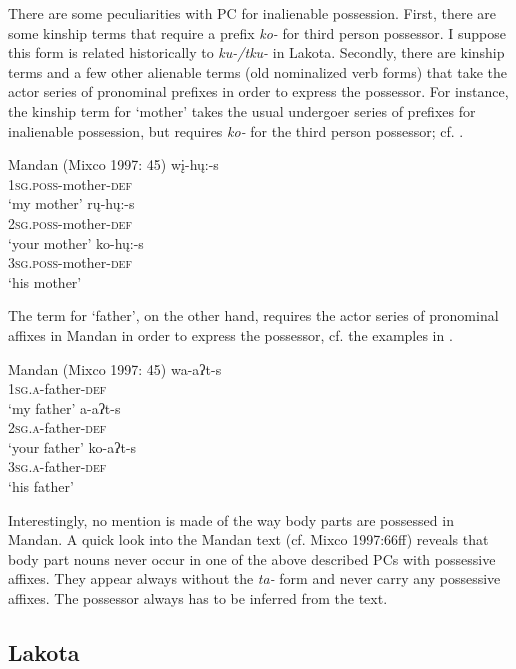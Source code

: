 \documentclass[output=paper]{LSP/langsci}
\begin{document}
There are some peculiarities with PC for inalienable possession. First, there are some kinship terms that require a prefix \textit{ko-} for third person possessor. I suppose this form is related historically to \textit{ku-/tku-} in Lakota. Secondly, there are kinship terms and a few other alienable terms (old nominalized verb forms) that take the actor series of pronominal prefixes in order to express the possessor. For instance, the kinship term for `mother' takes the usual undergoer series of prefixes for inalienable possession, but requires \textit{ko-} for the third person possessor; cf. . 

\ea Mandan (Mixco 1997: 45) \label{mandanmother}
\ea
\gll wį-hų:-s \\			
\textsc{1sg.poss}-mother-\textsc{def} \\
\glt `my mother'
\ex \gll rų-hų:-s \\
\textsc{2sg.poss}-mother-\textsc{def} \\
\glt `your mother'
\ex \gll ko-hų:-s \\
\textsc{3sg.poss}-mother-\textsc{def} \\
\glt `his mother'
\z \z

The term for `father', on the other hand, requires the actor series of pronominal affixes in Mandan in order to express the possessor, cf. the examples in .

\ea Mandan (Mixco 1997: 45) \label{mandanfather}
\ea \gll wa-aʔt-s \\
\textsc{1sg.a}-father-\textsc{def} \\
\glt `my father'
\ex \gll a-aʔt-s \\
\textsc{2sg.a}-father-\textsc{def} \\
\glt `your father'
\ex \gll ko-aʔt-s \\
\textsc{3sg.a}-father-\textsc{def} \\
\glt `his father'
\z \z

Interestingly, no mention is made of the way body parts are possessed in Mandan. A quick look into the Mandan text (cf. Mixco 1997:66ff) reveals that body part nouns never occur in one of the above described PCs with possessive affixes. They appear always without the \textit{ta-} form and never carry any possessive affixes. The possessor always has to be inferred from the text.

\subsection{Lakota}
\end{document}
